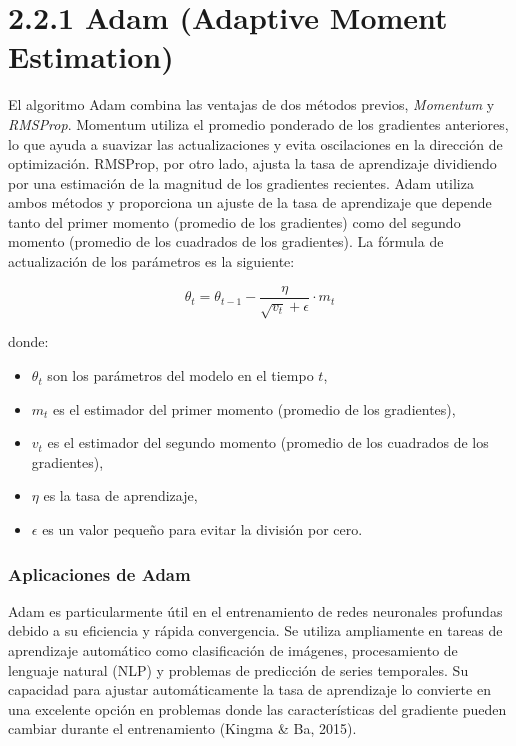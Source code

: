 \documentclass{article}
\begin{document}
\section*{2.2.1 Adam (Adaptive Moment Estimation)}

El algoritmo Adam combina las ventajas de dos métodos previos, \textit{Momentum} y \textit{RMSProp}. Momentum utiliza el promedio ponderado de los gradientes anteriores, lo que ayuda a suavizar las actualizaciones y evita oscilaciones en la dirección de optimización. RMSProp, por otro lado, ajusta la tasa de aprendizaje dividiendo por una estimación de la magnitud de los gradientes recientes. Adam utiliza ambos métodos y proporciona un ajuste de la tasa de aprendizaje que depende tanto del primer momento (promedio de los gradientes) como del segundo momento (promedio de los cuadrados de los gradientes). La fórmula de actualización de los parámetros es la siguiente:

\[
\theta_t = \theta_{t-1} - \frac{\eta}{\sqrt{v_t} + \epsilon} \cdot m_t
\]

donde:
\begin{itemize}
	\item \( \theta_t \) son los parámetros del modelo en el tiempo \( t \),
	\item \( m_t \) es el estimador del primer momento (promedio de los gradientes),
	\item \( v_t \) es el estimador del segundo momento (promedio de los cuadrados de los gradientes),
	\item \( \eta \) es la tasa de aprendizaje,
	\item \( \epsilon \) es un valor pequeño para evitar la división por cero.
\end{itemize}

\subsubsection*{Aplicaciones de Adam}

Adam es particularmente útil en el entrenamiento de redes neuronales profundas debido a su eficiencia y rápida convergencia. Se utiliza ampliamente en tareas de aprendizaje automático como clasificación de imágenes, procesamiento de lenguaje natural (NLP) y problemas de predicción de series temporales. Su capacidad para ajustar automáticamente la tasa de aprendizaje lo convierte en una excelente opción en problemas donde las características del gradiente pueden cambiar durante el entrenamiento (Kingma \& Ba, 2015).
\end{document}
